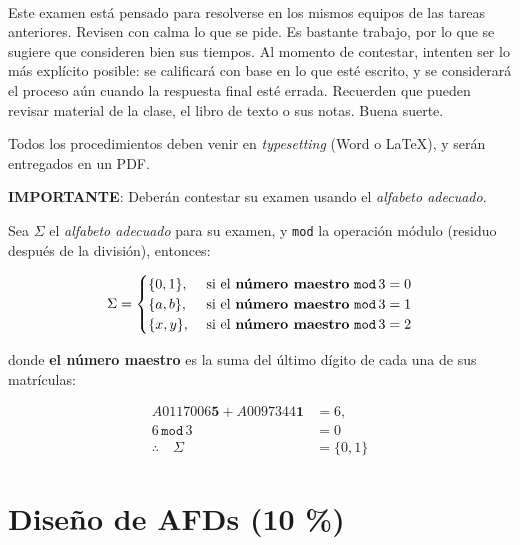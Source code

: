 \documentclass[8pt, onside]{article}
\title{
    \myclass \\
    \textbf{\mytitle} \\
    \myheader
    \date{}
}
\begin{document}
\maketitle

\vspace{-1.5cm}

Este examen está pensado para resolverse en los mismos equipos de las tareas anteriores.
Revisen con calma lo que se pide. Es bastante trabajo, por lo que se sugiere que consideren bien sus tiempos.
Al momento de contestar, intenten ser lo más explícito posible: se calificará con base en lo que esté escrito, y se considerará el proceso aún cuando la respuesta final esté errada.
Recuerden que pueden revisar material de la clase, el libro de texto o sus notas.
Buena suerte.

\vspace{1.5ex}

Todos los procedimientos deben venir en \textit{typesetting} (Word o \LaTeX), y serán entregados en un PDF.

\vspace{1.5ex}

\textbf{IMPORTANTE}: Deberán contestar su examen usando el \textit{alfabeto adecuado}.

\vspace{1.5ex}

Sea $\Sigma$ el \textit{alfabeto adecuado} para su examen, y \texttt{mod} la operación módulo (residuo después de la división), entonces:

$$ \Sigma = 
\begin{cases}
   \{0,1\}, & \text{ si el \textbf{número maestro} } \mathtt{mod} \, 3 = 0 \\
   \{a,b\}, & \text{ si el \textbf{número maestro} } \mathtt{mod} \, 3 = 1 \\
   \{x,y\}, & \text{ si el \textbf{número maestro} } \mathtt{mod} \, 3 = 2 \\
\end{cases}
$$

donde \textbf{el número maestro} es la suma del último dígito de cada una de sus matrículas:

\begin{align*}
    A0117006\mathbf{5} + A0097344\mathbf{1} & =  6, \\
    6 \, \mathtt{mod} \, 3 & = 0 \\
    \therefore \quad \Sigma & = \{0,1\}
\end{align*}
\vspace{-2ex}
\section{Diseño de AFDs (10 \%)}
\end{document}
